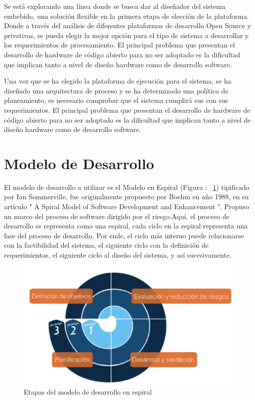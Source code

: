 Se está explorando una línea donde se busca dar al diseñador del sistema embebido, una solución flexible en la primera etapa de elección de
la plataforma. Donde a través del análisis de diferentes plataformas de desarrollo Open Source y privativas, se pueda elegir la mejor opción para el
tipo de sistema a desarrollar y los requerimientos de procesamiento. El principal problema que presentan el desarrollo de hardware de código abierto para
no ser adoptado es la dificultad que implican tanto a nivel de diseño hardware como de desarrollo software. 

Una vez que se ha elegido la plataforma de ejecución para el sistema, se ha diseñado una arquitectura de proceso y se ha determinado una política de
planeamiento, es necesario comprobar que el sistema cumplirá sus con sus requerimientos. El principal problema que presentan el desarrollo de
hardware de código abierto para no ser adoptado es la dificultad que implican tanto a nivel de diseño hardware como de desarrollo software.

\section{Modelo de Desarrollo}
El modelo de desarrollo a utilizar es el Modelo en Espiral (Figura : ~\ref{fig:esquema}) tipificado por Ian Sommerville\cite{Etiqueta00}, fue
originalmente propuesto por Boehm en año 1988, en su artículo " A Spiral Model of Software Development and Enhancement ". Propuso un marco del
proceso de software dirigido por el riesgo.Aquí, el proceso de desarrollo se representa como una espiral, cada ciclo en la espiral representa una
fase del proceso de desarrollo. Por ende, el ciclo más interno puede relacionarse con la factibilidad del sistema, el siguiente ciclo con la
definición de requerimientos, el siguiente ciclo al diseño del sistema, y así sucesivamente. 

\begin{figure}[h!]
 \begin{center}
  \includegraphics[width=1\textwidth,keepaspectratio=true]{./images/ESPIRAL}
  \caption{Etapas del modelo de desarrollo en espiral}
  \label{fig:esquema}
 \end{center}
\end{figure}

